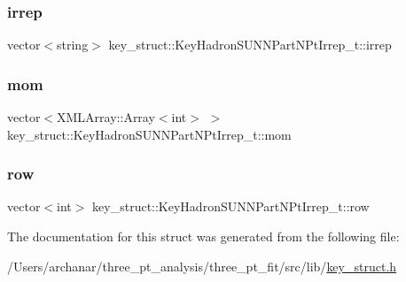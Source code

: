 \subsubsection{\texorpdfstring{irrep}{irrep}}
{\footnotesize\ttfamily vector$<$string$>$ key\+\_\+struct\+::\+Key\+Hadron\+S\+U\+N\+N\+Part\+N\+Pt\+Irrep\+\_\+t\+::irrep}

\mbox{\label{structkey__struct_1_1KeyHadronSUNNPartNPtIrrep__t_ad3b5d985478c4f7c3aae5f6f64ee3e40}} 
\subsubsection{\texorpdfstring{mom}{mom}}
{\footnotesize\ttfamily vector$<$X\+M\+L\+Array\+::\+Array$<$int$>$ $>$ key\+\_\+struct\+::\+Key\+Hadron\+S\+U\+N\+N\+Part\+N\+Pt\+Irrep\+\_\+t\+::mom}

\mbox{\label{structkey__struct_1_1KeyHadronSUNNPartNPtIrrep__t_abf2e067ab900ef89c51b00867cc176ff}} 
\subsubsection{\texorpdfstring{row}{row}}
{\footnotesize\ttfamily vector$<$int$>$ key\+\_\+struct\+::\+Key\+Hadron\+S\+U\+N\+N\+Part\+N\+Pt\+Irrep\+\_\+t\+::row}



The documentation for this struct was generated from the following file\+:\begin{DoxyCompactItemize}
\item 
/\+Users/archanar/three\+\_\+pt\+\_\+analysis/three\+\_\+pt\+\_\+fit/src/lib/\mbox{\hyperlink{key__struct_8h}{key\+\_\+struct.\+h}}\end{DoxyCompactItemize}
